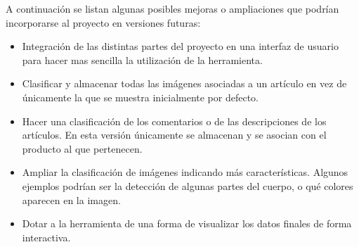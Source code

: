 A continuación se listan algunas posibles mejoras o ampliaciones que podrían incorporarse al proyecto en versiones futuras:

\begin{itemize}
    \item Integración de las distintas partes del proyecto en una interfaz de usuario para hacer mas sencilla la utilización de la herramienta.
    \item Clasificar y almacenar todas las imágenes asociadas a un artículo en vez de únicamente la que se muestra inicialmente por defecto.
    \item Hacer una clasificación de los comentarios o de las descripciones de los artículos. En esta versión únicamente se almacenan y se asocian con el producto al que pertenecen.
    \item Ampliar la clasificación de imágenes indicando más características. Algunos ejemplos podrían ser la detección de algunas partes del cuerpo, o qué colores aparecen en la imagen.
    \item Dotar a la herramienta de una forma de visualizar los datos finales de forma interactiva.
\end{itemize}